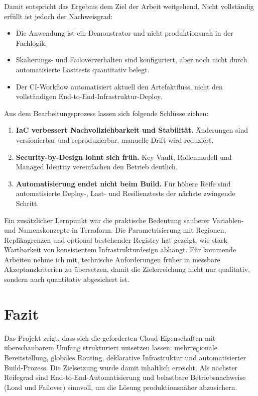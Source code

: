 \documentclass[a4paper,11pt]{article}
\begin{document}
Damit entspricht das Ergebnis dem Ziel der Arbeit weitgehend.
Nicht vollständig erfüllt ist jedoch der Nachweisgrad:
\begin{itemize}
  \item Die Anwendung ist ein Demonstrator und nicht produktionsnah in der Fachlogik.
  \item Skalierungs- und Failoververhalten sind konfiguriert, aber noch nicht durch automatisierte Lasttests quantitativ belegt.
  \item Der CI-Workflow automatisiert aktuell den Artefaktfluss, nicht den vollständigen End-to-End-Infrastruktur-Deploy.
\end{itemize}
Aus dem Bearbeitungsprozess lassen sich folgende Schlüsse ziehen:
\begin{enumerate}
  \item \textbf{IaC verbessert Nachvollziehbarkeit und Stabilität.} Änderungen sind versionierbar und reproduzierbar, manuelle Drift wird reduziert.
  \item \textbf{Security-by-Design lohnt sich früh.} Key Vault, Rollenmodell und Managed Identity vereinfachen den Betrieb deutlich.
  \item \textbf{Automatisierung endet nicht beim Build.} Für höhere Reife sind automatisierte Deploy-, Last- und Resilienztests der nächste zwingende Schritt.
\end{enumerate}
Ein zusätzlicher Lernpunkt war die praktische Bedeutung sauberer Variablen- und Namenskonzepte in Terraform.
Die Parametrisierung mit Regionen, Replikagrenzen und optional bestehender Registry hat gezeigt, wie stark Wartbarkeit
von konsistentem Infrastrukturdesign abhängt.
Für kommende Arbeiten nehme ich mit, technische Anforderungen früher in messbare Akzeptanzkriterien zu übersetzen,
damit die Zielerreichung nicht nur qualitativ, sondern auch quantitativ abgesichert ist.

\section*{Fazit}
Das Projekt zeigt, dass sich die geforderten Cloud-Eigenschaften mit überschaubarem Umfang strukturiert umsetzen lassen:
mehrregionale Bereitstellung, globales Routing, deklarative Infrastruktur und automatisierter Build-Prozess.
Die Zielsetzung wurde damit inhaltlich erreicht.
Als nächster Reifegrad sind End-to-End-Automatisierung und belastbare Betriebsnachweise (Load und Failover) sinnvoll, um die Lösung produktionsnäher abzusichern.
\end{document}
